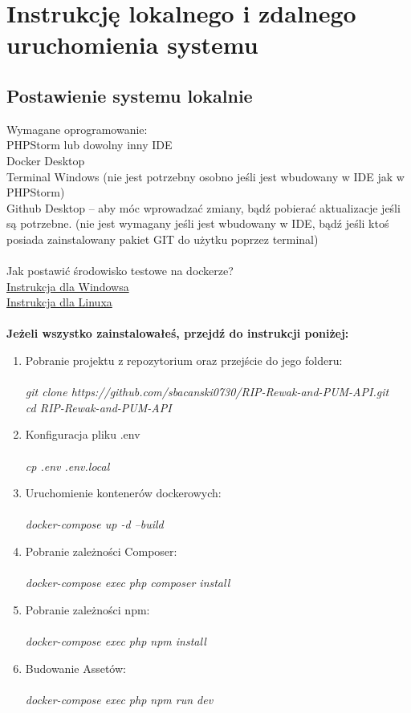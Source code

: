 \documentclass{article}
\begin{document}
\section{Instrukcję lokalnego i zdalnego uruchomienia systemu}
\subsection{Postawienie systemu lokalnie}
Wymagane oprogramowanie:\\
PHPStorm lub dowolny inny IDE\\
Docker Desktop\\
Terminal Windows (nie jest potrzebny osobno jeśli jest wbudowany w IDE jak w PHPStorm)\\
Github Desktop – aby móc wprowadzać zmiany, bądź pobierać aktualizacje jeśli są potrzebne. (nie jest wymagany  jeśli jest wbudowany w IDE, bądź jeśli ktoś posiada zainstalowany pakiet GIT do użytku poprzez terminal)\\\\
Jak postawić środowisko testowe na dockerze?\\
\href{https://docs.docker.com/docker-for-windows/}{Instrukcja dla Windowsa}\\
\href{https://docs.docker.com/compose/install/}{Instrukcja dla Linuxa}\\\\
\textbf{Jeżeli wszystko zainstalowałeś, przejdź do instrukcji poniżej:}
\begin{enumerate}
    \item Pobranie projektu z repozytorium oraz przejście do jego folderu: \\\\
    \emph{ git clone https://github.com/sbacanski0730/RIP-Rewak-and-PUM-API.git} \\
   			 \emph{ cd RIP-Rewak-and-PUM-API} \\
    \item Konfiguracja pliku .env\\\\
    \emph{cp .env .env.local} \\
    \item Uruchomienie kontenerów dockerowych:\\\\
    \emph{docker-compose up -d --build}\\
    \item Pobranie zależności Composer:\\\\
    \emph{docker-compose exec php composer install}\\
 			 \item Pobranie zależności npm:\\\\
 		   \emph{docker-compose exec php npm install}\\
 			 \item Budowanie Assetów:\\\\
 		   \emph{docker-compose exec php npm run dev}\\
    \end{enumerate}
\end{document}
